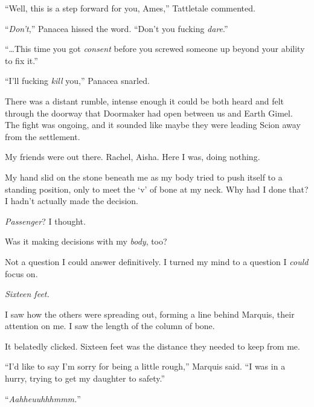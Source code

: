 ``Well, this is a step forward for you, Ames,'' Tattletale commented.



``\emph{Don't},'' Panacea hissed the word.  ``Don't you fucking \emph{dare}.''



``\ldots{}This time you got \emph{consent} before you screwed someone up beyond your ability to fix it.''



``I'll fucking \emph{kill} you,'' Panacea snarled.



There was a distant rumble, intense enough it could be both heard and felt through the doorway that Doormaker had open between us and Earth Gimel.  The fight was ongoing, and it sounded like maybe they were leading Scion away from the settlement.



My friends were out there.  Rachel, Aisha.  Here I was, doing nothing.



My hand slid on the stone beneath me as my body tried to push itself to a standing position, only to meet the `v' of bone at my neck.  Why had I done that?  I hadn't actually made the decision.



\emph{Passenger}?  I thought.



Was it making decisions with my \emph{body}, too?



Not a question I could answer definitively.  I turned my mind to a question I \emph{could} focus on.



\emph{Sixteen feet. }



I saw how the others were spreading out, forming a line behind Marquis, their attention on me.  I saw the length of the column of bone.



It belatedly clicked.  Sixteen feet was the distance they needed to keep from me.



``I'd like to say I'm sorry for being a little rough,'' Marquis said.  ``I was in a hurry, trying to get my daughter to safety.''



``\emph{Aahheuuhhhmmm.}''



